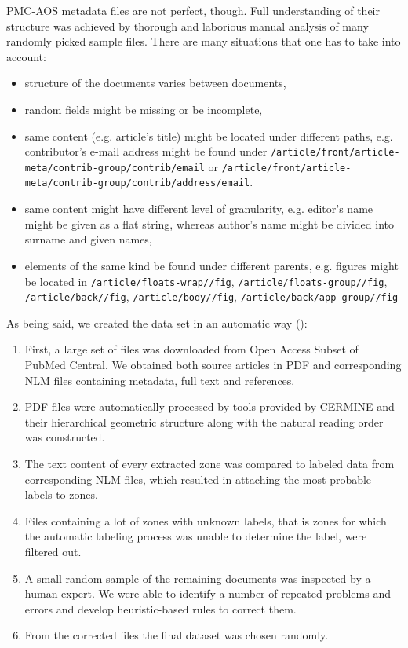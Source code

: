 PMC-AOS metadata files are not perfect, though. Full understanding of their structure was achieved by thorough and laborious manual analysis of many randomly picked sample files. There are many situations that one has to take into account:
\begin{itemize}
\item structure of the documents varies between documents,
\item random fields might be missing or be incomplete,
\item same content (e.g. article's title) might be located under different paths, e.g. contributor's e-mail address might be found under \verb+/article/front/article-meta/contrib-group/contrib/email+ or \verb+/article/front/article-meta/contrib-group/contrib/address/email+.
\item same content might have different level of granularity, e.g. editor's name might be given as a flat string, whereas author's name might be divided into surname and given names,
\item elements of the same kind be found under different parents, e.g. figures might be located in \verb+/article/floats-wrap//fig+, \verb+/article/floats-group//fig+, \verb+/article/back//fig+, \verb+/article/body//fig+, \verb+/article/back/app-group//fig+
\end{itemize}
As being said, we created the data set in an automatic way (\cite{DominikaTkaczykPaweSzostek2014}):
\begin{enumerate}
    \item First, a large set of files was downloaded from Open Access Subset of PubMed Central. We obtained both source articles in PDF and corresponding NLM files containing metadata, full text and references.
    \item PDF files were automatically processed by tools provided by CERMINE and their hierarchical geometric structure along with the natural reading order was constructed.
    \item The text content of every extracted zone was compared to labeled data from corresponding NLM files, which resulted in attaching the most probable labels to zones.
    \item Files containing a lot of zones with unknown labels, that is zones for which the automatic labeling process was unable to determine the label, were filtered out.
    \item A small random sample of the remaining documents was inspected by a human expert. We were able to identify a number of repeated problems and errors and develop heuristic-based rules to correct them.
    \item From the corrected files the final dataset was chosen randomly.
\end{enumerate}

